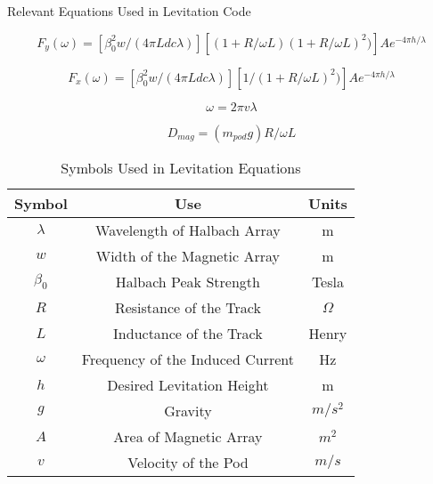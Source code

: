 \documentclass[12]{article}
\begin{document}
\centering
Relevant Equations Used in Levitation Code

$$F_{y}(\omega)=[\beta _{0}^{2}w/(4\pi Ldc\lambda )][( 1+R/\omega L)(1+R/\omega L)^{2})]Ae^{-4\pi h/\lambda }$$

$$F_{x}(\omega)=[\beta _{0}^{2}w/(4\pi Ldc\lambda )][1/(1+R/\omega L)^{2})]Ae^{-4\pi h/\lambda }$$

$$\omega =2\pi v\lambda $$

$$D_{mag}=( m_{pod}g)R/\omega L$$

\begin{table}[ht]
\caption{Symbols Used in Levitation Equations} 
\centering 
\begin{tabular}{c c c} 
\hline\hline 
Symbol & Use & Units\\ [0.5ex] 
\hline 
$\lambda$ & Wavelength of Halbach Array & m\\
$w$ & Width of the Magnetic Array & m\\
$\beta _{0}$ & Halbach Peak Strength & Tesla\\
$R$ & Resistance of the Track & $\Omega$\\
$L$ & Inductance of the Track & Henry\\
$\omega$ & Frequency of the Induced Current & Hz\\
$h$ & Desired Levitation Height & m\\
$g$ & Gravity & $m/s^{2}$\\
$A$ & Area of Magnetic Array & $m^{2}$\\
$v$ & Velocity of the Pod & $m/s$\\ [1ex] 

\hline 
\end{tabular}
\label{table:nonlin} 
\end{table}
\end{document}
